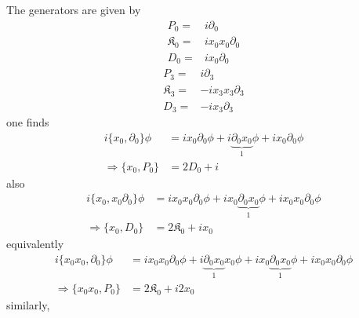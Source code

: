 \documentclass[]{article}
\numberwithin{equation}{section}
\begin{document}
{{\begin{table}[h!]
\centering
\caption{\label{tabelinterpolationifd}$1+0$ conformal algebra in IFD}
\end{table}
The generators are given by
\begin{align}
    P_{0}=&i\partial_{0}\\
    \mathfrak{K}_{{0}}=&ix_{0}x_{0}\partial_{{0}}\\
    D_{0}=&ix_{0}\partial_{0}
\end{align}
\begin{align}
    P_{3}=&i\partial_{3}\\
    \mathfrak{K}_{{3}}=&-ix_{3}x_{3}\partial_{{3}}\\
    D_{3}=&-ix_{3}\partial_{3}
\end{align}
one finds
\begin{align}
    i\{x_{0},\partial_{0}\}\phi&=ix_{0}\partial_{0}\phi+i\underbrace{\partial_{0}x_{0}}_{1}\phi+ix_{0}\partial_{0}\phi\\
    \Longrightarrow \{x_{0},P_{0}\}&=2D_{0}+i
\end{align}
also
\begin{align}
    i\{x_{0},x_{0}\partial_{0}\}\phi&=ix_{0}x_{0}\partial_{0}\phi+ix_{0}\underbrace{\partial_{0}x_{0}}_{1}\phi+ix_{0}x_{0}\partial_{0}\phi\\
    \Longrightarrow \{x_{0},D_{0}\}&=2\mathfrak{K}_{0}+ix_{0}
\end{align}
equivalently 
\begin{align}
    i\{x_{0}x_{0},\partial_{0}\}\phi&=ix_{0}x_{0}\partial_{0}\phi+i\underbrace{\partial_{0}x_{0}}_{1}x_{0}\phi+ix_{0}\underbrace{\partial_{0}x_{0}}_{1}\phi+ix_{0}x_{0}\partial_{0}\phi\\
    \Longrightarrow \{x_{0}x_{0},P_{0}\}&=2\mathfrak{K}_{0}+i2x_{0}
\end{align}
similarly,
\begin{align}

\end{align}}}
\end{document}
